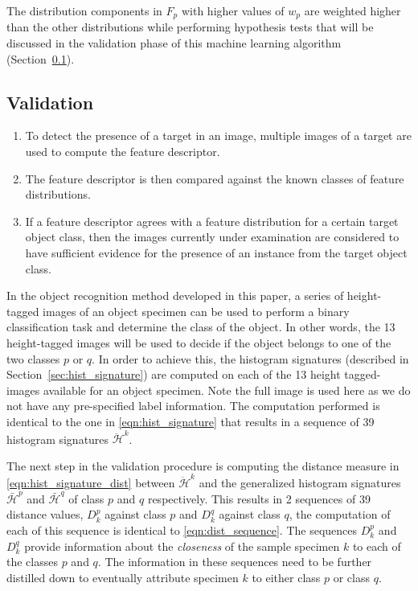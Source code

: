 \documentclass {udthesis}
\begin{document}
The distribution components in $F_p$ with higher values of $w_p$ are weighted higher than the other distributions while performing hypothesis tests that will be discussed in the validation phase of this machine learning algorithm (Section~\ref{sec:distdes_validation}).

\subsection{Validation}
\label{sec:distdes_validation}

\begin{enumerate}
	\item To detect the presence of a target in an image, multiple images of a target are used to compute the feature descriptor.
	
	\item The feature descriptor is then compared against the known classes of feature distributions.
	
	\item If a feature descriptor agrees with a feature distribution for a certain target object class, then the images currently under examination are considered to have sufficient evidence for the presence of an instance from the target object class.
\end{enumerate}

In the object recognition method developed in this paper, a series of height-tagged images of an object specimen can be used to perform a binary classification task and determine the class of the object. In other words, the 13 height-tagged images will be used to decide if the object belongs to one of the two classes $p$ or $q$. In order to achieve this, the histogram signatures (described in Section~\ref{sec:hist_signature}) are computed on each of the 13 height tagged-images available for an object specimen. Note the full image is used here as we do not have any pre-specified label information. The computation performed is identical to the one in \eqref{eqn:hist_signature} that results in a sequence of 39 histogram signatures $\ddot{\mathcal{H}}^{k}$. 

The next step in the validation procedure is computing the distance measure in \eqref{eqn:hist_signature_dist} between $\ddot{\mathcal{H}}^{k}$ and the generalized histogram signatures $\bar{\mathcal{H}}^{p}$ and $\bar{\mathcal{H}}^{q}$ of class $p$ and $q$ respectively. This results in 2 sequences of 39 distance values, $D^p_k$ against class $p$ and $D^q_k$ against class $q$, the computation of each of this sequence is identical to \eqref{eqn:dist_sequence}. The sequences $D^p_k$ and $D^q_k$ provide information about the \emph{closeness} of the sample specimen $k$ to each of the classes $p$ and $q$. The information in these sequences need to be further distilled down to eventually attribute specimen $k$ to either class $p$ or class $q$.
\end{document}
